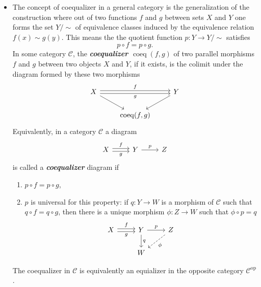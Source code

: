 \documentclass{article}
\newcommand{\Cc}{\mathcal{C}}
\DeclareMathOperator{\op}{op}
\DeclareMathOperator{\coeq}{coeq}
\begin{document}
\begin{defn}
\begin{itemize}
		\item The concept of coequalizer in a general category is the generalization of the construction where out of two functions $f$ and $g$ between sets $X$ and $Y$ one forms the set $Y/\sim$ of equivalence classes induced by the equivalence relation $f(x)\sim g(y)$. This means the the quotient function $p:Y\to Y/\sim$ satisfies
		\[p\circ f=p\circ g.\]
		In some category $\Cc$, the \textbf{\textit{coequalizer $\coeq(f,g)$}} of two parallel morphisms $f$ and $g$ between two objects $X$ and $Y$, if it exists, is the colimit under the diagram formed by these two morphisms
		\[\begin{tikzcd}
		X\arrow[rr,shift={(0,0.07)},"f"]\arrow[rr,shift={(0,-0.07)},"g",swap]\arrow[dr]&&Y\arrow[ld]\\
		&\coeq(f,g)
		\end{tikzcd}\]
		Equivalently, in a category $\Cc$ a diagram
		\[\begin{tikzcd}
			X\arrow[r,shift={(0,0.07)},"f"]\arrow[r,shift={(0,-0.07)},"g",swap]&Y\arrow[r,"p"]&Z
		\end{tikzcd}\]
		is called a \textbf{\textit{coequalizer}} diagram if
		\begin{enumerate}
			\item $p\circ f=p\circ g$,
			\item $p$ is universal for this property: if $q:Y\to W$ is a morphism of $\Cc$ such that $q\circ f=q\circ g$, then there is a unique morphism $\phi:Z\to W$ such that $\phi\circ p=q$
				\[\begin{tikzcd}
				X\arrow[r,shift={(0,0.07)},"f"]\arrow[r,shift={(0,-0.07)},"g",swap]&Y\arrow[d,"q"]\arrow[r,"p"]&Z\arrow[dl,"\phi",dashed]\\
				&W
			\end{tikzcd}\]
		\end{enumerate}
		The coequalizer in $\Cc$ is equivalently an equializer in the opposite category $\Cc^{\op}$.
		

\end{itemize}
\end{defn}
\end{document}

